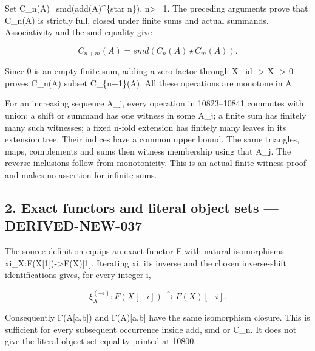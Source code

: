 \documentclass[11pt]{article}
\begin{document}
Set C\_\allowbreak{}n(A)\allowbreak{}\allowbreak{}=smd(add(A)\allowbreak{}\textasciicircum{}\{star n\})\allowbreak{},\allowbreak{} n>\allowbreak{}=1. The preceding arguments prove that C\_\allowbreak{}n(A)\allowbreak{} is strictly full,\allowbreak{} closed under finite sums and actual summands. Associativity and the smd equality give

\[
 C_{n+m}(A)=smd(C_n(A)\star C_m(A)).
\]

Since 0 is an empty finite sum,\allowbreak{} adding a zero factor through X --id-\allowbreak{}-> X \allowbreak{}-> 0 proves C\_\allowbreak{}n(A)\allowbreak{} subset C\_\allowbreak{}\{n\allowbreak{}+1\}(A)\allowbreak{}. All these operations are monotone in A.

For an increasing sequence A\_\allowbreak{}j,\allowbreak{} every operation in 10823–\allowbreak{}10841 commutes with union:\allowbreak{} a shift or summand has one witness in some A\_\allowbreak{}j; a finite sum has finitely many such witnesses; a fixed n-fold extension has finitely many leaves in its extension tree. Their indices have a common upper bound. The same triangles,\allowbreak{} maps,\allowbreak{} complements and sums then witness membership using that A\_\allowbreak{}j. The reverse inclusions follow from monotonicity. This is an actual finite-witness proof and makes no assertion for infinite sums.

\subsection{2. Exact functors and literal object sets --- DERIVED-NEW-037}\label{proofs-10691-11108-exact-functors-and-literal-object-sets-derived-new-037}

The source definition equips an exact functor F with natural isomorphisms xi\_\allowbreak{}X:\allowbreak{}F(X[1]\allowbreak{})\allowbreak{}\allowbreak{}->F(X)\allowbreak{}[1]\allowbreak{}. Iterating xi,\allowbreak{} its inverse and the chosen inverse-shift identifications gives,\allowbreak{} for every integer i,\allowbreak{}

\[
 \xi_X^{(-i)}:F(X[-i])\xrightarrow{\sim}F(X)[-i].
\]

Consequently F(A[a,\allowbreak{}b]\allowbreak{})\allowbreak{} and F(A)\allowbreak{}[a,\allowbreak{}b]\allowbreak{} have the same isomorphism closure. This is sufficient for every subsequent occurrence inside add,\allowbreak{} smd or C\_\allowbreak{}n. It does not give the literal object-set equality printed at 10800.
\end{document}
